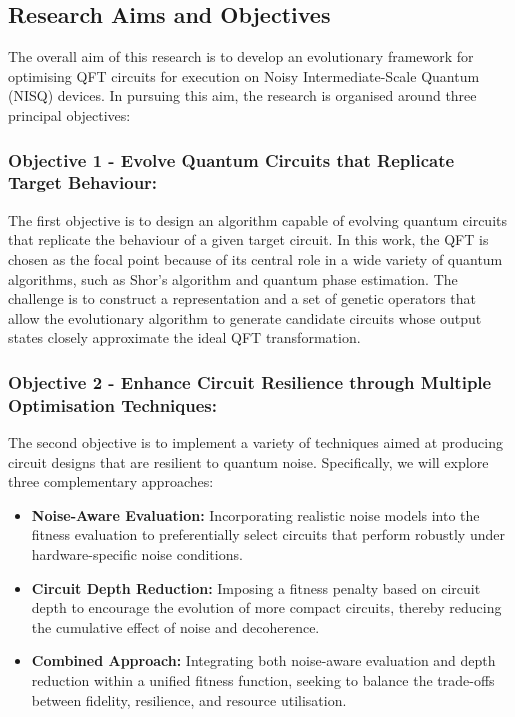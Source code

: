 \documentclass[11pt,a4paper]{article}
\begin{document}
\subsection{Research Aims and Objectives}
The overall aim of this research is to develop an evolutionary framework for optimising QFT circuits for execution on Noisy Intermediate-Scale Quantum (NISQ) devices. In pursuing this aim, the research is organised around three principal objectives:

\subsubsection*{Objective 1 - Evolve Quantum Circuits that Replicate Target Behaviour:}
The first objective is to design an algorithm capable of evolving quantum circuits that replicate the behaviour of a given target circuit. In this work, the QFT is chosen as the focal point because of its central role in a wide variety of quantum algorithms, such as Shor’s algorithm and quantum phase estimation. The challenge is to construct a representation and a set of genetic operators that allow the evolutionary algorithm to generate candidate circuits whose output states closely approximate the ideal QFT transformation.

\subsubsection*{Objective 2 - Enhance Circuit Resilience through Multiple Optimisation Techniques:}
The second objective is to implement a variety of techniques aimed at producing circuit designs that are resilient to quantum noise. Specifically, we will explore three complementary approaches:
\begin{itemize}
    \item \textbf{Noise-Aware Evaluation:} Incorporating realistic noise models into the fitness evaluation to preferentially select circuits that perform robustly under hardware-specific noise conditions.
    \item \textbf{Circuit Depth Reduction:} Imposing a fitness penalty based on circuit depth to encourage the evolution of more compact circuits, thereby reducing the cumulative effect of noise and decoherence.
    \item \textbf{Combined Approach:} Integrating both noise-aware evaluation and depth reduction within a unified fitness function, seeking to balance the trade-offs between fidelity, resilience, and resource utilisation.
\end{itemize}
\end{document}
